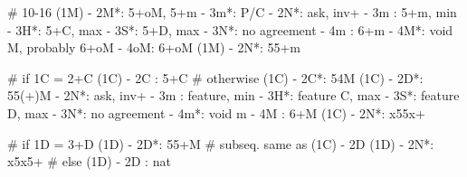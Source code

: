 # 10-16
(1M) - 2M*: 5+oM, 5+m
          - 3m*: P/C
          - 2N*: ask, inv+
               - 3m : 5+m, min
               - 3H*: 5+C, max
               - 3S*: 5+D, max
               - 3N*: no agreement
               - 4m : 6+m
               - 4M*: void M, probably 6+oM
               - 4oM: 6+oM
(1M) - 2N*: 55+m

# if 1C = 2+C
(1C) - 2C : 5+C
# otherwise
(1C) - 2C*: 54M
(1C) - 2D*: 55(+)M 
          - 2N*: ask, inv+
               - 3m : feature, min
               - 3H*: feature C, max
               - 3S*: feature D, max
               - 3N*: no agreement
               - 4m*: void m
               - 4M : 6+M
(1C) - 2N*: x55x+

# if 1D = 3+D
(1D) - 2D*: 55+M  # subseq. same as (1C) - 2D
(1D) - 2N*: x5x5+
# else
(1D) - 2D : nat 
